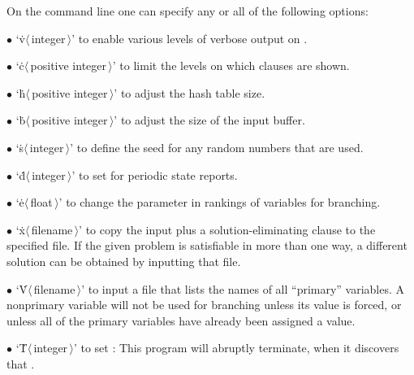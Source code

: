 On the command line one can specify any or all of the following options:
\smallskip
\item{$\bullet$}
`\.v$\langle\,$integer$\,\rangle$' to enable various levels of verbose
output on .
\item{$\bullet$}
`\.c$\langle\,$positive integer$\,\rangle$' to limit the levels on which
clauses are shown.
\item{$\bullet$}
`\.h$\langle\,$positive integer$\,\rangle$' to adjust the hash table size.
\item{$\bullet$}
`\.b$\langle\,$positive integer$\,\rangle$' to adjust the size of the input
buffer.
\item{$\bullet$}
`\.s$\langle\,$integer$\,\rangle$' to define the seed for any random numbers
that are used.
\item{$\bullet$}
`\.d$\langle\,$integer$\,\rangle$' to set  for periodic state
reports.
\item{$\bullet$}
`\.e$\langle\,$float$\,\rangle$' to change the  parameter in
rankings of
variables for branching.
\item{$\bullet$}
`\.x$\langle\,$filename$\,\rangle$' to copy the input plus a
solution-eliminating clause to the specified file. If the given problem is
satisfiable in more than one way, a different solution can be obtained by
inputting that file.
\item{$\bullet$}
`\.V$\langle\,$filename$\,\rangle$' to input a file that lists the names
of all ``primary'' variables. A nonprimary variable will not be used for
branching unless its value is forced, or unless all of the primary variables
have already been assigned a value.
\item{$\bullet$}
`\.T$\langle\,$integer$\,\rangle$' to set : This program will
abruptly terminate, when it discovers that .

